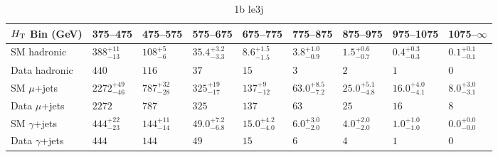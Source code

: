 \documentclass[8pt]{article}
\def\scalht{\mbox{$H_{\rm{T}}$}\xspace}
\newcommand\T{\rule{0pt}{2.6ex}}
\newcommand\B{\rule[-1.2ex]{0pt}{0pt}}
\begin{document}
\begin{table}[ht!]
\caption{1b le3j}
\label{tab:ensemble-1b le3j}
\centering
\begin{tabular}{ lllllllll }

\hline
\scalht Bin (GeV)       & 375--475                       & 475--575                       & 575--675                       & 675--775                       & 775--875                       & 875--975                       & 975--1075                      & 1075--$\infty$                 \\ [1.000000ex]
\hline
SM hadronic\T           & $388^{+11}_{-13}$              & $108^{+5}_{-6}$                & $35.4^{+3.2}_{-3.3}$           & $8.6^{+1.5}_{-1.5}$            & $3.8^{+1.0}_{-0.9}$            & $1.5^{+0.6}_{-0.7}$            & $0.4^{+0.3}_{-0.3}$            & $0.1^{+0.1}_{-0.1}$            \\ 
Data hadronic\B         & $440$                          & $116$                          & $37$                           & $15$                           & $3$                            & $2$                            & $1$                            & $0$                            \\ 
\hline
SM $\mu$+jets\T         & $2272^{+49}_{-46}$             & $787^{+32}_{-28}$              & $325^{+19}_{-17}$              & $137^{+9}_{-12}$               & $63.0^{+8.5}_{-7.2}$           & $25.0^{+5.1}_{-4.8}$           & $16.0^{+4.0}_{-4.1}$           & $8.0^{+3.0}_{-3.1}$            \\ 
Data $\mu$+jets\B       & $2272$                         & $787$                          & $325$                          & $137$                          & $63$                           & $25$                           & $16$                           & $8$                            \\ 
\hline
SM $\gamma$+jets\T      & $444^{+22}_{-23}$              & $144^{+11}_{-14}$              & $49.0^{+7.2}_{-6.8}$           & $15.0^{+4.2}_{-4.0}$           & $6.0^{+3.0}_{-2.0}$            & $4.0^{+2.0}_{-2.0}$            & $1.0^{+1.0}_{-1.0}$            & $0.0^{+0.0}_{-0.0}$            \\ 
Data $\gamma$+jets\B    & $444$                          & $144$                          & $49$                           & $15$                           & $6$                            & $4$                            & $1$                            & $0$                            \\ 
\hline

\end{tabular}
\end{table}
\end{document}
